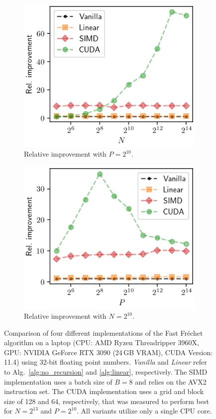 \begin{figure}[htbp]
\begin{subfigure}{.49\textwidth}
        \includegraphics[width=.8\textwidth]{img/desktop/rel_performance-N.png}
        \caption{Relative improvement with $P = 2^{10}$.}
    \end{subfigure}
    \begin{subfigure}{.49\textwidth}
        \includegraphics[width=.8\textwidth]{img/desktop/rel_performance-pP.png}
        \caption{Relative improvement with $N = 2^{10}$.}
    \end{subfigure}
    \caption{Comparison of four different implementations of the Fast Fr\'echet algorithm on a laptop (CPU: AMD Ryzen Threadripper 3960X, GPU: NVIDIA GeForce RTX 3090 (24\,GB VRAM), CUDA Version: 11.4) using 32-bit floating point numbers. \textit{Vanilla} and \textit{Linear} refer to Alg.~\ref{alg:no_recursion} and \ref{alg:linear}, respectively. The SIMD implementation uses a batch size of $B = 8$ and relies on the AVX2 instruction set. The CUDA implementation uses a grid and block size of 128 and 64, respectively, that was measured to perform best for $N=2^{13}$ and $P=2^{10}$. All variants utilize only a single CPU core.}
    \label{fig:benchmark_desktop}
\end{figure}
